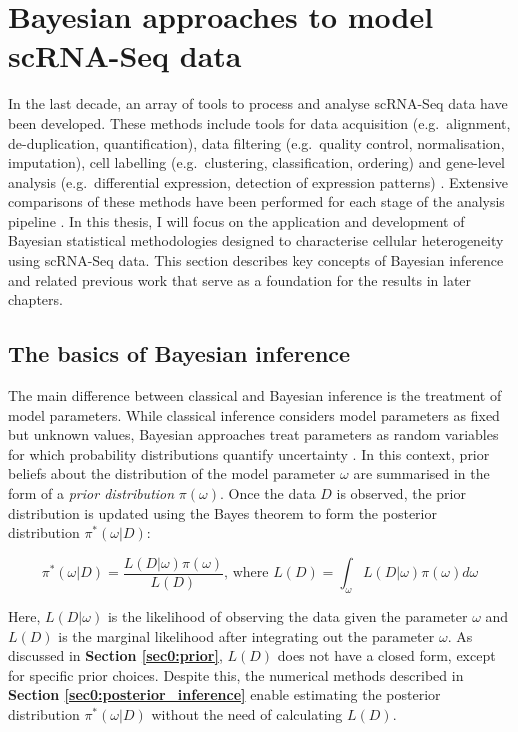
\section{Bayesian approaches to model scRNA-Seq data}

In the last decade, an array of tools to process and analyse scRNA-Seq data have been developed. These methods include tools for data acquisition (e.g.~alignment, de-duplication, quantification), data filtering (e.g.~quality control, normalisation, imputation), cell labelling (e.g.~clustering, classification, ordering) and gene-level analysis (e.g.~differential expression, detection of expression patterns) \citep{Zappia2018}. Extensive comparisons of these methods have been performed for each stage of the analysis pipeline \citep{Saelens2018, Soneson2018}. In this thesis, I will focus on the application and development of Bayesian statistical methodologies designed to characterise cellular heterogeneity using scRNA-Seq data. This section describes key concepts of Bayesian inference and related previous work that serve as a foundation for the results in later chapters.

\subsection{The basics of Bayesian inference}

The main difference between classical and Bayesian inference is the treatment of model parameters. While classical inference considers model parameters as fixed but unknown values, Bayesian approaches treat parameters as random variables for which probability distributions quantify uncertainty \citep{Bernardo2003}. In this context, prior beliefs about the distribution of the model parameter $\omega$ are summarised in the form of a \emph{prior distribution} $\pi(\omega)$. Once the data $D$ is observed, the prior distribution is updated using the Bayes theorem \cite{Bayes1763} to form the posterior distribution $\pi^*(\omega|D)$:

\begin{equation} \label{eq0:Bayes_theorem}
\pi^*(\omega|D)=\frac{L(D|\omega)\pi(\omega)}{L(D)}\text{, where }L(D)=\int_\omega{}L(D|\omega)\pi(\omega)d\omega 
\end{equation}

Here, $L(D|\omega)$ is the likelihood of observing the data given the parameter $\omega$ and $L(D)$ is the marginal likelihood after integrating out the parameter $\omega$. As discussed in \textbf{Section \ref{sec0:prior}}, $L(D)$ does not have a closed form, except for specific prior choices. Despite this, the numerical methods described in \textbf{Section \ref{sec0:posterior_inference}} enable estimating the posterior distribution $\pi^*(\omega|D)$ without the need of calculating $L(D)$.


